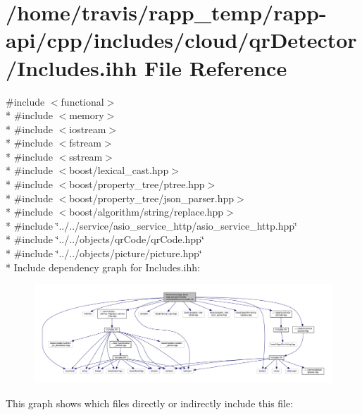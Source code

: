 \hypertarget{cloud_2qrDetector_2Includes_8ihh}{\section{/home/travis/rapp\-\_\-temp/rapp-\/api/cpp/includes/cloud/qr\-Detector/\-Includes.ihh File Reference}
\label{cloud_2qrDetector_2Includes_8ihh}
}
{\ttfamily \#include $<$functional$>$}\\*
{\ttfamily \#include $<$memory$>$}\\*
{\ttfamily \#include $<$iostream$>$}\\*
{\ttfamily \#include $<$fstream$>$}\\*
{\ttfamily \#include $<$sstream$>$}\\*
{\ttfamily \#include $<$boost/lexical\-\_\-cast.\-hpp$>$}\\*
{\ttfamily \#include $<$boost/property\-\_\-tree/ptree.\-hpp$>$}\\*
{\ttfamily \#include $<$boost/property\-\_\-tree/json\-\_\-parser.\-hpp$>$}\\*
{\ttfamily \#include $<$boost/algorithm/string/replace.\-hpp$>$}\\*
{\ttfamily \#include \char`\"{}../../service/asio\-\_\-service\-\_\-http/asio\-\_\-service\-\_\-http.\-hpp\char`\"{}}\\*
{\ttfamily \#include \char`\"{}../../objects/qr\-Code/qr\-Code.\-hpp\char`\"{}}\\*
{\ttfamily \#include \char`\"{}../../objects/picture/picture.\-hpp\char`\"{}}\\*
Include dependency graph for Includes.\-ihh\-:
\nopagebreak
\begin{figure}[H]
\begin{center}
\leavevmode
\includegraphics[width=350pt]{cloud_2qrDetector_2Includes_8ihh__incl}
\end{center}
\end{figure}
This graph shows which files directly or indirectly include this file\-:

